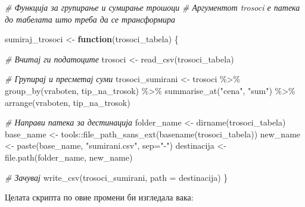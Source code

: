 \documentclass[
]{book}
\newenvironment{Shaded}{\begin{snugshade}}{\end{snugshade}}
\newcommand{\AttributeTok}[1]{\textcolor[rgb]{0.77,0.63,0.00}{#1}}
\newcommand{\CommentTok}[1]{\textcolor[rgb]{0.56,0.35,0.01}{\textit{#1}}}
\newcommand{\ControlFlowTok}[1]{\textcolor[rgb]{0.13,0.29,0.53}{\textbf{#1}}}
\newcommand{\FunctionTok}[1]{\textcolor[rgb]{0.00,0.00,0.00}{#1}}
\newcommand{\NormalTok}[1]{#1}
\newcommand{\OtherTok}[1]{\textcolor[rgb]{0.56,0.35,0.01}{#1}}
\newcommand{\SpecialCharTok}[1]{\textcolor[rgb]{0.00,0.00,0.00}{#1}}
\newcommand{\StringTok}[1]{\textcolor[rgb]{0.31,0.60,0.02}{#1}}
\begin{document}
\begin{Shaded}
\begin{Highlighting}[]
\CommentTok{\# Функција за групирање и сумирање трошоци}
\CommentTok{\# Аргументот \textasciigrave{}trosoci\textasciigrave{} е патека до табелата што треба да се трансформира}

\NormalTok{sumiraj\_trosoci }\OtherTok{\textless{}{-}} \ControlFlowTok{function}\NormalTok{(trosoci\_tabela) \{}
  
  \CommentTok{\# Вчитај ги податоците}
\NormalTok{  trosoci }\OtherTok{\textless{}{-}} \FunctionTok{read\_csv}\NormalTok{(trosoci\_tabela)}
  
  \CommentTok{\# Групирај и пресметај суми}
\NormalTok{  trosoci\_sumirani }\OtherTok{\textless{}{-}}\NormalTok{ trosoci }\SpecialCharTok{\%\textgreater{}\%}
    \FunctionTok{group\_by}\NormalTok{(vraboten, tip\_na\_trosok) }\SpecialCharTok{\%\textgreater{}\%}
    \FunctionTok{summarise\_at}\NormalTok{(}\StringTok{"cena"}\NormalTok{, }\StringTok{"sum"}\NormalTok{) }\SpecialCharTok{\%\textgreater{}\%} 
    \FunctionTok{arrange}\NormalTok{(vraboten, tip\_na\_trosok)}
  
  \CommentTok{\# Направи патека за дестинација}
\NormalTok{  folder\_name }\OtherTok{\textless{}{-}} \FunctionTok{dirname}\NormalTok{(trosoci\_tabela)}
\NormalTok{  base\_name }\OtherTok{\textless{}{-}}\NormalTok{ tools}\SpecialCharTok{::}\FunctionTok{file\_path\_sans\_ext}\NormalTok{(}\FunctionTok{basename}\NormalTok{(trosoci\_tabela))}
\NormalTok{  new\_name }\OtherTok{\textless{}{-}} \FunctionTok{paste}\NormalTok{(base\_name, }\StringTok{"sumirani.csv"}\NormalTok{, }\AttributeTok{sep=}\StringTok{"{-}"}\NormalTok{)}
\NormalTok{  destinacija }\OtherTok{\textless{}{-}} \FunctionTok{file.path}\NormalTok{(folder\_name, new\_name)}
  
  \CommentTok{\# Зачувај}
  \FunctionTok{write\_csv}\NormalTok{(trosoci\_sumirani, }\AttributeTok{path =}\NormalTok{ destinacija)}
\NormalTok{\}}
\end{Highlighting}
\end{Shaded}

Целата скрипта по овие промени би изгледала вака:
\end{document}
